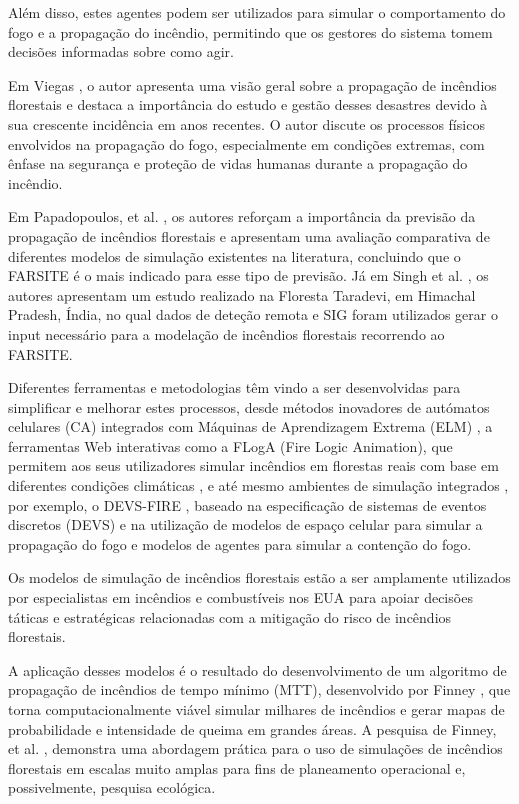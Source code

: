 Além disso, estes agentes podem ser utilizados para simular o comportamento do fogo e a propagação do incêndio, permitindo que os gestores do sistema tomem decisões informadas sobre como agir.

Em Viegas \cite{Viegas2011OverviewResearch}, o autor apresenta uma visão geral sobre a propagação de incêndios florestais e destaca a importância do estudo e gestão desses desastres devido à sua crescente incidência em anos recentes. O autor discute os processos físicos envolvidos na propagação do fogo, especialmente em condições extremas, com ênfase na segurança e proteção de vidas humanas durante a propagação do incêndio.

Em Papadopoulos, et al. \cite{Papadopoulos2011ASimulators}, os autores reforçam a importância da previsão da propagação de incêndios florestais e apresentam uma avaliação comparativa de diferentes modelos de simulação existentes na literatura, concluindo que o FARSITE é o mais indicado para esse tipo de previsão. Já em Singh et al. \cite{Singh2017ForestGIS}, os autores apresentam um estudo realizado na Floresta Taradevi, em Himachal Pradesh, Índia, no qual dados de deteção remota e SIG foram utilizados gerar o input necessário para a modelação de incêndios florestais recorrendo ao FARSITE.

Diferentes ferramentas e metodologias têm vindo a ser desenvolvidas para simplificar e melhorar estes processos, desde métodos inovadores de autómatos celulares (CA) integrados com Máquinas de Aprendizagem Extrema (ELM) \cite{Zheng2017ForestMachine}, a ferramentas Web interativas como a FLogA (Fire Logic Animation), que permitem aos seus utilizadores simular incêndios em florestas reais com base em diferentes condições climáticas \cite{Bogdos2013ACapabilities}, e até mesmo ambientes de simulação integrados \cite{Finney2011ASimulation}, por exemplo, o DEVS-FIRE \cite{Ntaimo2008DEVS-FIRE:Containment}, baseado na especificação de sistemas de eventos discretos (DEVS) e na utilização de modelos de espaço celular para simular a propagação do fogo e modelos de agentes para simular a contenção do fogo.

Os modelos de simulação de incêndios florestais estão a ser amplamente utilizados por especialistas em incêndios e combustíveis nos EUA para apoiar decisões táticas e estratégicas relacionadas com a mitigação do risco de incêndios florestais. \cite{Ager2009ApplicationAnalysis}

A aplicação desses modelos é o resultado do desenvolvimento de um algoritmo de propagação de incêndios de tempo mínimo (MTT), desenvolvido por Finney \cite{Ager2009ApplicationAnalysis}, que torna computacionalmente viável simular milhares de incêndios e gerar mapas de probabilidade e intensidade de queima em grandes áreas. A pesquisa de Finney, et al. \cite{Ager2009ApplicationAnalysis, Finney2011AStates}, demonstra uma abordagem prática para o uso de simulações de incêndios florestais em escalas muito amplas para fins de planeamento operacional e, possivelmente, pesquisa ecológica.